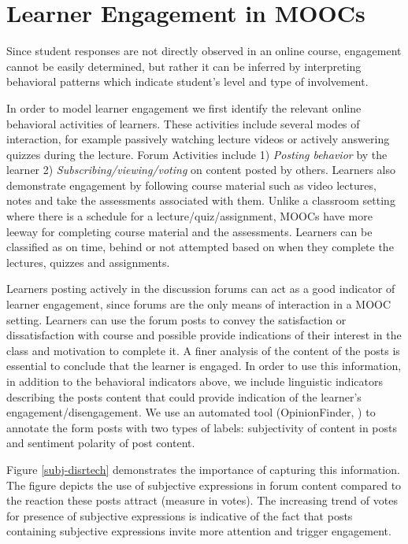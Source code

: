 \section{Learner Engagement in MOOCs}
\label{sec:learner_engage}

Since student responses are not directly observed in an online course, engagement cannot be easily determined, but rather it can be inferred by interpreting behavioral patterns which indicate student's level and type of involvement. 

In order to model learner engagement we first identify the relevant online behavioral activities of learners. These activities include several modes of interaction, for example passively watching lecture videos or actively answering quizzes during the lecture. Forum Activities include 1) \textit{Posting behavior} by the learner 2) \textit{Subscribing/viewing/voting} on content posted by others. Learners also demonstrate engagement by following course material such as video lectures, notes and take the assessments associated with them. Unlike a classroom setting where there is a schedule for a lecture/quiz/assignment, MOOCs have more leeway for completing course material and the assessments. Learners can be classified as on time, behind or not attempted based on when they complete the lectures, quizzes and assignments. 

Learners posting actively in the discussion forums can act as a good indicator of learner engagement, since forums are the only means of interaction in a MOOC setting.
Learners can use the forum posts to convey the satisfaction or dissatisfaction with course and possible provide indications of their interest in the class and motivation to complete it.
A finer analysis of the content of the posts is essential to conclude that the learner is engaged.
In order to use this information, in addition to the behavioral indicators above, we include linguistic indicators describing the posts content that could provide indication of the learner's engagement/disengagement. We use an automated tool (OpinionFinder, \cite{opinionfinder}) to annotate the form posts with two types of labels: subjectivity of content in posts and sentiment polarity of post content.

 Figure \ref{subj-disrtech} demonstrates the importance of capturing this information. The figure depicts the use of subjective expressions in forum content compared to the reaction these posts attract (measure in votes). The increasing trend of votes for presence of subjective expressions is indicative of the fact that posts containing subjective expressions invite more attention and trigger engagement.

